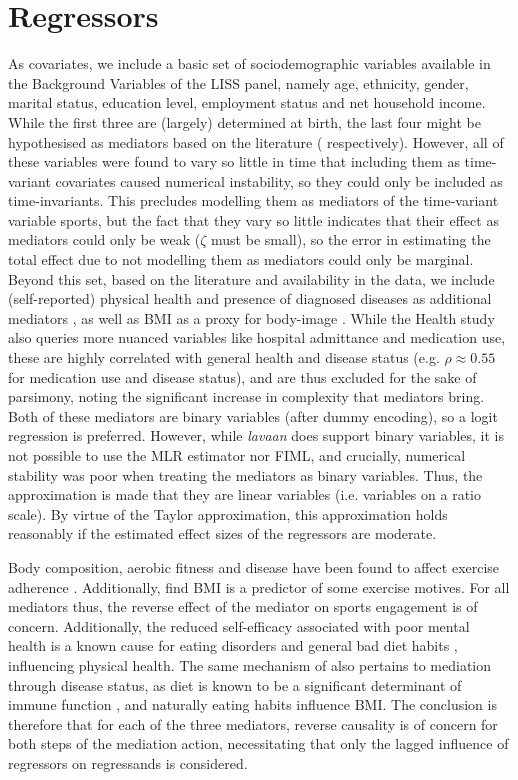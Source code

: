 \section{Regressors}
\label{sec:modelling:regressors}
As covariates, we include a basic set of sociodemographic variables available in the Background Variables of the LISS panel,
namely age, ethnicity, gender, marital status, education level, employment status and net household income.
While the first three are (largely) determined at birth, the last four might be hypothesised as mediators based on the literature
( respectively).
However, all of these variables were found to vary so little in time that including them as time-variant covariates caused
numerical instability, so they could only be included as time-invariants. This precludes modelling them as mediators
of the time-variant variable sports,
but the fact that they vary so little indicates that their effect as mediators could only be weak ($\zeta$ must be small),
so the error in estimating the total effect due to not modelling them as mediators could only be marginal.
Beyond this set, based on the literature and availability in the data, we include (self-reported) physical health
and presence of diagnosed diseases as additional mediators \cite{westcott2012resistance},
as well as BMI as a proxy for body-image \cite{westcott2012resistance}.
While the Health study also queries more nuanced variables like hospital admittance and medication use, these are
highly correlated with general health and disease status (e.g. $\rho \approx 0.55$ for medication use and disease status),
and are thus excluded for the sake of parsimony, noting the significant increase in complexity that mediators bring.
Both of these mediators are binary variables (after dummy encoding), so a logit regression is preferred.
However, while \textit{lavaan} does support binary variables, it is not possible to use the MLR estimator nor FIML,
and crucially, numerical stability was poor when treating the mediators as binary variables.
Thus, the approximation is made that they are linear variables (i.e. variables on a ratio scale).
By virtue of the Taylor approximation, this approximation holds reasonably if the estimated effect sizes of the regressors
are moderate.

Body composition, aerobic fitness and disease have been found to affect exercise adherence \cite{abernethy2012biophysical}.
Additionally,  find BMI is a predictor of some exercise motives.
For all mediators thus, the reverse effect of the mediator on sports engagement is of concern.
Additionally, the reduced self-efficacy associated with poor mental health is a known cause for
eating disorders and general bad diet habits \cite{oellingrath2014eating}, influencing physical health.
The same mechanism of also pertains to mediation through disease status, as diet is known to be a
significant determinant of immune function \cite{childs2019diet}, and naturally eating habits influence BMI.
The conclusion is therefore that for each of the three mediators,
reverse causality is of concern for both steps of the mediation action,
necessitating that only the lagged influence of regressors on regressands is considered.

